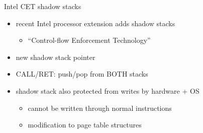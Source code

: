 \begin{frame}{Intel CET shadow stacks}
    \begin{itemize}
    \item recent Intel processor extension adds shadow stacks
        \begin{itemize}
        \item ``Control-flow Enforcement Technology''
        \end{itemize}
    \vspace{.5cm}
    \item new shadow stack pointer
    \item CALL/RET: push/pop from BOTH stacks
    \item shadow stack also protected from writes by hardware + OS
        \begin{itemize}
        \item cannot be written through normal instructions
        \item modification to page table structures
        \end{itemize}
    \end{itemize}
\end{frame}
